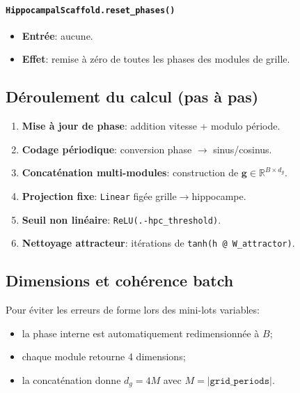 \documentclass[12pt,a4paper]{article}
\begin{document}
\paragraph{\texttt{HippocampalScaffold.reset\_phases()}}
\begin{itemize}[leftmargin=*]
    \item \textbf{Entrée}: aucune.
    \item \textbf{Effet}: remise à zéro de toutes les phases des modules de grille.
\end{itemize}

\subsection{Déroulement du calcul (pas à pas)}
\begin{enumerate}[leftmargin=*]
    \item \textbf{Mise à jour de phase}: addition vitesse + modulo période.
    \item \textbf{Codage périodique}: conversion phase $\rightarrow$ sinus/cosinus.
    \item \textbf{Concaténation multi-modules}: construction de $\mathbf{g}\in\mathbb{R}^{B\times d_g}$.
    \item \textbf{Projection fixe}: \texttt{Linear} figée grille$\rightarrow$hippocampe.
    \item \textbf{Seuil non linéaire}: \texttt{ReLU(.-hpc\_threshold)}.
    \item \textbf{Nettoyage attracteur}: itérations de \texttt{tanh(h @ W\_attractor)}.
\end{enumerate}

\subsection{Dimensions et cohérence batch}
Pour éviter les erreurs de forme lors des mini-lots variables:
\begin{itemize}[leftmargin=*]
    \item la phase interne est automatiquement redimensionnée à $B$;
    \item chaque module retourne 4 dimensions;
    \item la concaténation donne $d_g=4M$ avec $M=\lvert\texttt{grid\_periods}\rvert$.
\end{itemize}
\end{document}
